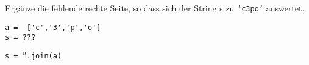 \question[1]
Ergänze die fehlende rechte Seite, so dass sich der String s zu
\texttt{'c3po'} auswertet.

\begin{lstlisting}
a =  ['c','3','p','o']
s = ???
\end{lstlisting}
\begin{solutionbox}{1cm}
\texttt{s = ''.join(a)}
\end{solutionbox}
